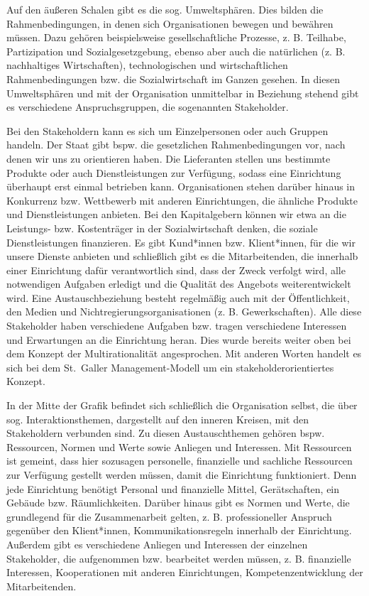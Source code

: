 \documentclass[
  letterpaper,
]{book}
\begin{document}
Auf den äußeren Schalen gibt es die sog. Umweltsphären. Dies bilden die
Rahmenbedingungen, in denen sich Organisationen bewegen und bewähren
müssen. Dazu gehören beispielsweise gesellschaftliche Prozesse, z. B.
Teilhabe, Partizipation und Sozialgesetzgebung, ebenso aber auch die
natürlichen (z. B. nachhaltiges Wirtschaften), technologischen und
wirtschaftlichen Rahmenbedingungen bzw. die Sozialwirtschaft im Ganzen
gesehen. In diesen Umweltsphären und mit der Organisation unmittelbar in
Beziehung stehend gibt es verschiedene Anspruchsgruppen, die sogenannten
Stakeholder.

Bei den Stakeholdern kann es sich um Einzelpersonen oder auch Gruppen
handeln. Der Staat gibt bspw. die gesetzlichen Rahmenbedingungen vor,
nach denen wir uns zu orientieren haben. Die Lieferanten stellen uns
bestimmte Produkte oder auch Dienstleistungen zur Verfügung, sodass eine
Einrichtung überhaupt erst einmal betrieben kann. Organisationen stehen
darüber hinaus in Konkurrenz bzw. Wettbewerb mit anderen Einrichtungen,
die ähnliche Produkte und Dienstleistungen anbieten. Bei den
Kapitalgebern können wir etwa an die Leistungs- bzw. Kostenträger in der
Sozialwirtschaft denken, die soziale Dienstleistungen finanzieren. Es
gibt Kund*innen bzw. Klient*innen, für die wir unsere Dienste anbieten
und schließlich gibt es die Mitarbeitenden, die innerhalb einer
Einrichtung dafür verantwortlich sind, dass der Zweck verfolgt wird,
alle notwendigen Aufgaben erledigt und die Qualität des Angebots
weiterentwickelt wird. Eine Austauschbeziehung besteht regelmäßig auch
mit der Öffentlichkeit, den Medien und Nichtregierungsorganisationen (z.
B. Gewerkschaften). Alle diese Stakeholder haben verschiedene Aufgaben
bzw. tragen verschiedene Interessen und Erwartungen an die Einrichtung
heran. Dies wurde bereits weiter oben bei dem Konzept der
Multirationalität angesprochen. Mit anderen Worten handelt es sich bei
dem St.~Galler Management-Modell um ein stakeholderorientiertes Konzept.

In der Mitte der Grafik befindet sich schließlich die Organisation
selbst, die über sog. Interaktionsthemen, dargestellt auf den inneren
Kreisen, mit den Stakeholdern verbunden sind. Zu diesen Austauschthemen
gehören bspw. Ressourcen, Normen und Werte sowie Anliegen und
Interessen. Mit Ressourcen ist gemeint, dass hier sozusagen personelle,
finanzielle und sachliche Ressourcen zur Verfügung gestellt werden
müssen, damit die Einrichtung funktioniert. Denn jede Einrichtung
benötigt Personal und finanzielle Mittel, Gerätschaften, ein Gebäude
bzw. Räumlichkeiten. Darüber hinaus gibt es Normen und Werte, die
grundlegend für die Zusammenarbeit gelten, z. B. professioneller
Anspruch gegenüber den Klient*innen, Kommunikationsregeln innerhalb der
Einrichtung. Außerdem gibt es verschiedene Anliegen und Interessen der
einzelnen Stakeholder, die aufgenommen bzw. bearbeitet werden müssen, z.
B. finanzielle Interessen, Kooperationen mit anderen Einrichtungen,
Kompetenzentwicklung der Mitarbeitenden.
\end{document}
